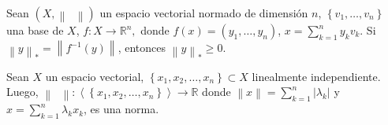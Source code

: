 \begin{prob}
    \label{prob9}
    Sean
    \begin{math}
        \left(
        X,
        \left\|
        \phantom{\cdot}
        \right\|
        \right)
    \end{math}
    un espacio vectorial normado de dimensión $n$,
    \begin{math}
        \left\{
        v_{1},\dotsc,
        v_{n}
        \right\}
    \end{math}
    una base de $X$,
    \begin{math}
        f\colon X\to\mathbb{R}^{n},
    \end{math}
    donde
    \begin{math}
        f\left(x\right)=
        \left(
        y_{1},
        \dotsc,
        y_{n}
        \right)
    \end{math},
    \begin{math}
        x=
        \sum_{k=1}^{n}
        y_{k}v_{k}
    \end{math}.
    Si
    \begin{math}
        {\left\|y\right\|}_{\ast}=
        \left\|
        f^{-1}
        \left(y\right)
        \right\|
    \end{math},
    entonces
    \begin{math}
        {\left\|y\right\|}_{\ast}\geq
        0
    \end{math}.
\end{prob}

\begin{prob}
    \label{prob10}
    Sean $X$ un espacio vectorial,
    \begin{math}
        \left\{
        x_{1},
        x_{2},
        \dotsc,
        x_{n}
        \right\}\subset X
    \end{math}
    linealmente independiente.
    Luego,
    \begin{math}
        \left\|
        \phantom{\cdot}
        \right\|\colon
        \left\langle
        \left\{
        x_{1},
        x_{2},
        \dotsc,
        x_{n}
        \right\}
        \right\rangle\to
        \mathbb{R}
    \end{math}
    donde
    \begin{math}
        \left\|
        x
        \right\|=
        \sum_{k=1}^{n}
        \left|
        \lambda_{k}
        \right|
    \end{math}
    y
    \begin{math}
        x=
        \sum_{k=1}^{n}
        \lambda_{k}x_{k}
    \end{math},
    es una norma.
\end{prob}


